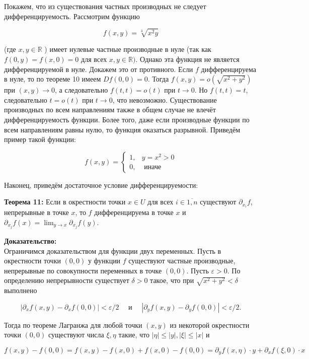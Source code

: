 \documentclass[a4paper,12pt]{article} %
\begin{document}
Покажем, что из существования частных производных не следует дифференцируемость. Рассмотрим функцию

$$
f(x, y)=\sqrt[3]{x^{2} y}
$$

(где $x, y \in \mathbb{R}$ ) имеет нулевые частные производные в нуле (так как $f(0, y)=f(x, 0)=0$ для всех $x, y \in \mathbb{R})$. Однако эта функция не является дифференцируемой в нуле. Докажем это от противного. Если $f$ дифференцируема в нуле, то по теореме 10 имеем $D f(0,0)=0$. Тогда $f(x, y)=o\left(\sqrt{x^{2}+y^{2}}\right)$ при $(x, y) \rightarrow 0$, а следовательно $f(t, t)=o(t)$ при $t \rightarrow 0$. Но $f(t, t)=t$, следовательно $t=o(t)$ при $t \rightarrow 0$, что невозможно. Существование производных по всем направлениям также в общем случае не влечёт дифференцируемость функции. Более того, даже если производные функции по всем направлениям равны нулю, то функция оказаться разрывной. Приведём пример такой функции:

$$
f(x, y)= \begin{cases}1, & y=x^{2}>0 \\ 0, & \text { иначе }\end{cases}
$$

Наконец, приведём достаточное условие дифференцируемости:

\textbf{Теорема 11:} Если в окрестности точки $x \in U$ для всех $i \in \overline{1, n}$ существуют $\partial_{x_{i}} f$, непрерывные в точке $x$, то $f$ дифференцируема в точке $x$ и $\partial_{x_{j}} f(x)=\lim _{y \rightarrow x} \partial_{x_{j}} f(y)$.

\textbf{Доказательство:}\\
Ограничимся доказательством для функции двух переменных. Пусть в окрестности точки $(0,0)$ у функции $f$ существуют частные производные, непрерывные по совокупности переменных в точке $(0,0)$. Пусть $\varepsilon>0$. По определению непрерывности существует $\delta>0$ такое, что при $\sqrt{x^{2}+y^{2}}<\delta$ выполнено

$$
\left|\partial_{x} f(x, y)-\partial_{x} f(0,0)\right|<\varepsilon / 2 \quad \text { и } \quad\left|\partial_{y} f(x, y)-\partial_{y} f(0,0)\right|<\varepsilon / 2 .
$$

Тогда по теореме Лагранжа для любой точки $(x, y)$ из некоторой окрестности точки $(0,0)$ существуют числа $\xi, \eta$ такие, что $|\eta| \leq|y|,|\xi| \leq|x|$ и

$$
f(x, y)-f(0,0)=f(x, y)-f(x, 0)+f(x, 0)-f(0,0)=\partial_{y} f(x, \eta) \cdot y+\partial_{x} f(\xi, 0) \cdot x
$$
\end{document}
